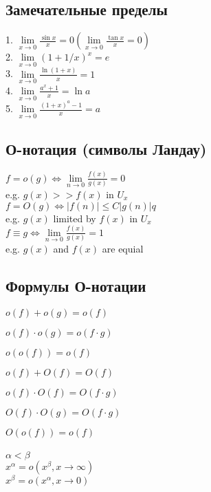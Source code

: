 \subsection{Замечательные пределы}

1. $ \lim\limits_{x\to 0} \frac{\sin{x}}{x} = 0 (\lim\limits_{x\to 0} \frac{\tan{x}}{x} = 0) $ \\
2. $ \lim\limits_{x\to 0} (1 + 1/x)^x = e $ \\
3. $ \lim\limits_{x\to 0} \frac{\ln{(1+x)}}{x} = 1 $ \\
4. $ \lim\limits_{x\to 0} \frac{a^x + 1}{x} = \ln{a} $ \\
5. $ \lim\limits_{x\to 0} \frac{(1 + x)^a - 1}{x} = a $ \\

\subsection{О-нотация (символы Ландау)}

$f = o(g) \Leftrightarrow \lim\limits_{n \to 0} \frac{f(x)}{g(x)} = 0$ \\
e.g. $g(x) >> f(x)$ in $U_x$ \\

$f = O(g) \Leftrightarrow |f(n)| \le C|g(n)|q $ \\
e.g. $g(x) $ limited by $ f(x)$ in $U_x$ \\

$f \equiv g \Leftrightarrow \lim\limits_{n \to 0} \frac{f(x)}{g(x)} = 1 $ \\
e.g. $g(x)$ and $f(x)$ are equial \\

\subsection{Формулы О-нотации}

$o(f)+o(g) = o(f)$

$o(f) \cdot o(g) = o(f \cdot g)$

$o(o(f)) = o(f)$

$o(f)+O(f) = O(f)$

$o(f) \cdot O(f) = O(f \cdot g)$

$O(f) \cdot O(g) = O(f \cdot g)$

$O(o(f)) = o(f)$ \\\\

$ \alpha < \beta $ \\
$x^{\alpha} = o(x^{\beta}, x\to \infty ) $ \\
$x^{\beta} = o(x^{\alpha}, x\to 0 )$ \\

